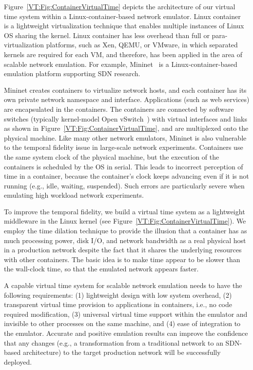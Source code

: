 \label{VT:Sec:Architecture}

Figure~\ref{VT:Fig:ContainerVirtualTime} depicts the architecture of our virtual time system within a Linux-container-based network emulator. 
Linux container~\cite{LXC} is a lightweight virtualization technique that enables multiple instances of Linux OS sharing the kernel. 
Linux container has less overhead than full or para-virtualization platforms, such as Xen, QEMU, or VMware,
in which separated kernels are required for each VM, and therefore,
has been applied in the area of scalable network emulation.
For example, Mininet~\cite{Mininet} is a Linux-container-based emulation platform supporting SDN research. 

Mininet creates containers to virtualize network hosts, and each container has its own private network namespace and interface. 
Applications (such as web services) are encapsulated in the containers. The containers are connected by software switches (typically kernel-model Open vSwitch~\cite{OpenvSwitch}) with virtual interfaces and links as shown in Figure~\ref{VT:Fig:ContainerVirtualTime}, and are multiplexed onto the physical machine. 
Like many other network emulators, Mininet is also vulnerable to the temporal fidelity issue in large-scale network experiments. 
Containers use the same system clock of the physical machine, but the execution of the containers is scheduled by the OS in serial. 
This leads to incorrect perception of time in a container, because the container's clock keeps advancing even if it is not running (e.g., idle, waiting, suspended). 
Such errors are particularly severe when emulating high workload network experiments.

To improve the temporal fidelity, we build a virtual time system as a lightweight middleware in the Linux kernel (see Figure~\ref{VT:Fig:ContainerVirtualTime}). 
We employ the time dilation technique to provide the illusion that a container has as much processing power,
disk I/O, and network bandwidth as a real physical host in a production network despite the fact that it shares the underlying resources with other containers. 
The basic idea is to make time appear to be slower than the wall-clock time, so that the emulated network appears faster.

A capable virtual time system for scalable network emulation needs to have the following requirements:
(1) lightweight design with low system overhead,
(2) transparent virtual time provision to applications in containers, i.e., no code required modification,
(3) universal virtual time support within the emulator and invisible to other processes on the same machine, and
(4) ease of integration to the emulator. 
Accurate and positive emulation results can improve the confidence that any changes
(e.g., a transformation from a traditional network to an SDN-based architecture) to the target production network will be successfully deployed. 

